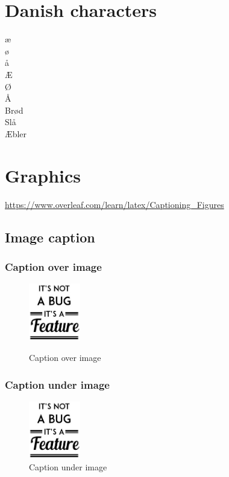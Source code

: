 \documentclass{report}
\begin{document}
    \chapter{Danish characters}
    æ\\
    ø\\
    å\\
    Æ\\
    Ø\\
    Å\\
    Brød\\
    Slå\\
    Æbler\\
    
    \chapter{Graphics}
    \url{https://www.overleaf.com/learn/latex/Captioning_Figures}
    \section{Image caption}
    \subsection{Caption over image}
    \begin{figure}[ht]
        \centering
        \caption{Caption over image}
        \includegraphics[width=0.20\textwidth]{coverpage/itisnotabugitisafeature.jpg}
        \label{fig:cap_over}
    \end{figure}
    \subsection{Caption under image}
    \begin{figure}[ht]
        \centering
        \includegraphics[width=0.20\textwidth]{coverpage/itisnotabugitisafeature.jpg}
        \caption{Caption under image}
        \label{fig:cap_under}
    \end{figure}
\end{document}
